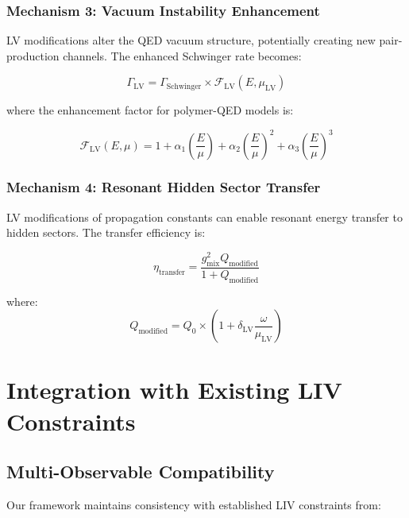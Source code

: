 \documentclass[12pt]{article}
\begin{document}
\subsubsection{Mechanism 3: Vacuum Instability Enhancement}

LV modifications alter the QED vacuum structure, potentially creating new pair-production channels. The enhanced Schwinger rate becomes:

\begin{equation}
\Gamma_{\text{LV}} = \Gamma_{\text{Schwinger}} \times \mathcal{F}_{\text{LV}}(E, \mu_{\text{LV}})
\end{equation}

where the enhancement factor for polymer-QED models is:

\begin{equation}
\mathcal{F}_{\text{LV}}(E, \mu) = 1 + \alpha_1\left(\frac{E}{\mu}\right) + \alpha_2\left(\frac{E}{\mu}\right)^2 + \alpha_3\left(\frac{E}{\mu}\right)^3
\end{equation}

\subsubsection{Mechanism 4: Resonant Hidden Sector Transfer}

LV modifications of propagation constants can enable resonant energy transfer to hidden sectors. The transfer efficiency is:

\begin{equation}
\eta_{\text{transfer}} = \frac{g_{\text{mix}}^2 Q_{\text{modified}}}{1 + Q_{\text{modified}}}
\end{equation}

where:
\begin{equation}
Q_{\text{modified}} = Q_0 \times \left(1 + \delta_{\text{LV}}\frac{\omega}{\mu_{\text{LV}}}\right)
\end{equation}

\section{Integration with Existing LIV Constraints}

\subsection{Multi-Observable Compatibility}

Our framework maintains consistency with established LIV constraints from:
\end{document}
